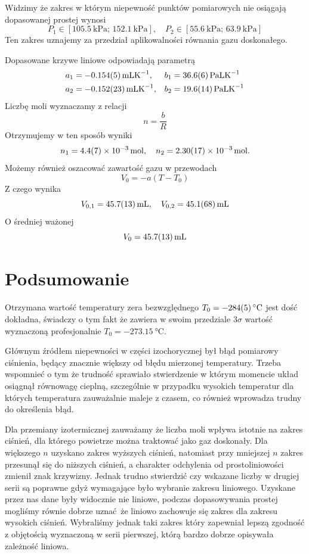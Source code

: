 \documentclass[12pt]{article}
\begin{document}
Widzimy że zakres w którym niepewność punktów pomiarowych nie osiągają dopasowanej prostej wynosi 
\[
  P_1 \in \left[\SI{105.5}{\kilo\pascal};\,\SI{152.1}{\kilo\pascal}\right], \quad
  P_2 \in \left[\SI{55.6}{\kilo\pascal};\,\SI{63.9}{\kilo\pascal}\right]
\]
Ten zakres uznajemy za przedział aplikowalności równania gazu doskonałego.


Dopasowane krzywe liniowe odpowiadają parametrą
\begin{align*}
  a_1 &= \SI{-0.154\pm0.005}{\milli\liter\kelvin^{-1}}, & b_1 &= \SI{36.6\pm0.6}{\pascal\liter\kelvin^{-1}}\\
  a_2 &= \SI{-0.152\pm0.023}{\milli\liter\kelvin^{-1}}, & b_2 &= \SI{19.6\pm1.4}{\pascal\liter\kelvin^{-1}}
\end{align*}
Liczbę moli wyznaczamy z relacji
\[
  n = \frac{b}{R}
\]
Otrzymujemy w ten sposób wyniki
\[
  n_1 = \SI{4.4\pm0.7e-3}{\mole}, \quad n_2 = \SI{2.3\pm0.17e-3}{\mole}.
\]
Możemy również oszacować zawartość gazu w przewodach
\[
    V_0 = -a (T-T_0)
\]
Z czego wynika
\[
    V_{0,1} = \SI{45.7\pm1.3}{\milli\liter}, \quad V_{0,2} = \SI{45.1\pm6.8}{\milli\liter} 
\]
O średniej ważonej
\[
    V_0 = \SI{45.7\pm1.3}{\milli\liter}
\]

\newpage

\section{Podsumowanie}
Otrzymana wartość temperatury zera bezwzględnego \(T_0 = \SI{-284\pm5}{\celsius}\) jest dość dokładna, świadczy o tym fakt że zawiera w swoim przedziale \(3\sigma\) wartość wyznaczoną profesjonalnie\cite{zero} \(T_0 = \SI{-273.15}{\celsius}\). 

Głównym źródłem niepewności w części izochorycznej był błąd pomiarowy ciśnienia, będący znacznie większy od błędu mierzonej temperatury. Trzeba wspomnieć o tym że trudność sprawiało stwierdzenie w którym momencie układ osiągnął równowagę cieplną, szczególnie w przypadku wysokich temperatur dla których temperatura zauważalnie maleje z czasem, co również wprowadza trudny do określenia błąd.

Dla przemiany izotermicznej zauważamy że liczba moli wpływa istotnie na zakres ciśnień, dla którego powietrze można traktować jako gaz doskonały. Dla większego \(n\) uzyskano zakres wyższych ciśnień, natomiast przy mniejszej \(n\) zakres przesunął się do niższych ciśnień, a charakter odchylenia od prostoliniowości zmienił znak krzywizny.
Jednak trudno stwierdzić czy wskazane liczby w drugiej serii są poprawne gdyż wymagające było wybranie zakresu liniowego. Uzyskane przez nas dane były widocznie nie liniowe, podczas dopasowywania prostej mogliśmy równie dobrze uznać że liniowo zachowuje się zakres dla zakresu wysokich ciśnień. Wybraliśmy jednak taki zakres który zapewniał lepszą zgodność z objętością wyznaczoną w serii pierwszej, którą bardzo dobrze opisywała zależność liniowa.
\end{document}
